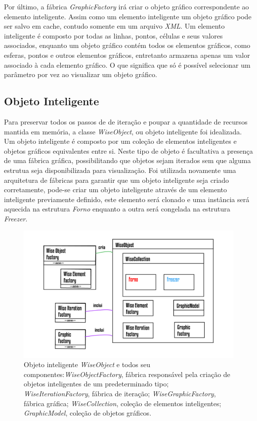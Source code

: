 \documentclass[
        english,			
        brazil			        %
        ,<...>]{abntbibufjf}
\begin{document}
Por último, a fábrica \textit{GraphicFactory} irá criar o objeto gráfico correspondente ao elemento inteligente. Assim como um elemento inteligente um objeto gráfico pode ser salvo em cache, contudo somente em um arquivo \textit{XML}.  Um elemento inteligente é composto por todas as linhas, pontos, células e seus valores associados, enquanto um objeto gráfico contém todos os elementos gráficos, como esferas, pontos e outros elementos gráficos, entretanto armazena apenas um valor associado à cada elemento gráfico. O que significa que só é possível selecionar um parâmetro por vez ao visualizar um objeto gráfico.


\subsection{Objeto Inteligente}\label{sec:objeto_inteligente}

Para preservar todos os passos de de iteração e poupar a quantidade de recursos mantida em memória, a classe \textit{WiseObject}, ou objeto inteligente foi idealizada. Um objeto inteligente é composto por um coleção de elementos inteligentes e objetos gráficos equivalentes entre si. Neste tipo de objeto é facultativa a presença de uma fábrica gráfica, possibilitando que objetos sejam iterados sem que alguma estrutua seja disponibilizada para visualização. Foi utilizada novamente uma arquitetura de fábricas para garantir que um objeto inteligente seja criado corretamente, pode-se criar um objeto inteligente através de um elemento inteligente previamente definido, este elemento será clonado e uma instância será aquecida na estrutura \textit{Forno} enquanto a outra será congelada na estrutura \textit{Freezer}.

\begin{figure}[!htbp]
	\centering
	\includegraphics[scale=1]{Figures/WiseObject.png}
	\caption{Objeto inteligente \textit{WiseObject} e todos seu componentes:\textit{WiseObjectFactory}, fábrica responsável pela criação de objetos inteligentes de um predeterminado tipo; \textit{WiseIterationFactory}, fábrica de iteração; \textit{WiseGraphicFactory}, fábrica gráfica; \textit{WiseCollection}, coleção de elementos inteligentes; \textit{GraphicModel}, coleção de objetos gráficos.}
	\label{fig7:wiseobject}
\end{figure}
\end{document}
